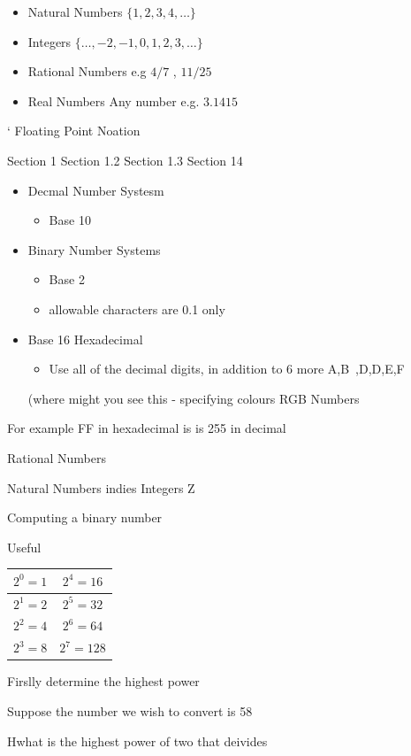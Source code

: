 \documentclass[]{report}
\begin{document}

\begin{itemize}
\item Natural Numbers $\{1,2,3,4, \ldots\}$
\item Integers $\{\ldots,-2,-1,0,1,2,3,\ldots\}$
\item Rational Numbers e.g $4/7$ , $11/25$
\item Real Numbers Any number e.g. $3.1415$
\end{itemize}




`
Floating Point Noation

Section 1
Section 1.2
Section 1.3
Section 14

\begin{itemize}
\item Decmal Number Systesm
\begin{itemize}
\item Base 10
\end{itemize}

\item Binary Number Systems
\begin{itemize}
\item Base 2
\item allowable characters are {0.1} only
\end{itemize}
\item Base 16 Hexadecimal
\begin{itemize}
\item Use all of the decimal digits, in addition to 6 more A,B~,D,D,E,F
\end{itemize}
(where might you see this  - specifying colours RGB Numbers
\end{itemize}

For example FF in hexadecimal is is 255 in decimal 


Rational Numbers

Natural Numbers indies
Integers Z



Computing a binary number

Useful
{
\begin{center}
\begin{tabular}{|c|c|}
\hline $2^0 = 1 $ & $2^4 = 16  $ \\ 
\hline $2^1 = 2 $ & $2^5 = 32$ \\ 
\hline $2^2 = 4 $ & $2^6 = 64$ \\ 
\hline $2^3 = 8 $ & $ 2^7 = 128$ \\ 
\hline 
\end{tabular} 
\end{center}
}


\newpage




Firslly determine the highest power

Suppose the number we wish to convert is 58

Hwhat is the highest power of two that deivides
\end{document}
